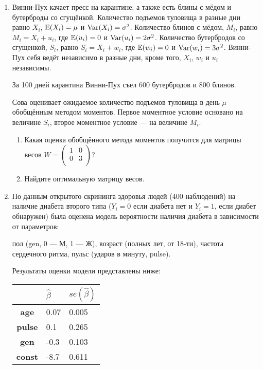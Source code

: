 \begin{enumerate}
  \item 
  Винни-Пух качает пресс на карантине, а также есть блины с мёдом и бутерброды со сгущёнкой. 
  Количество подъемов туловища в разные дни равно $X_i$, $\operatorname{\mathbb{E}}(X_i) = \mu$ и $\operatorname{Var}(X_i) = \sigma^2$.
  Количество блинов с мёдом, $M_i$, равно  $M_i = X_i + u_i$, где $\operatorname{\mathbb{E}}(u_i) = 0$ и $\operatorname{Var}(u_i)= 2\sigma^2$. 
  Количество бутербродов со сгущенкой, $S_i$, равно  $S_i = X_i + w_i$, где $\operatorname{\mathbb{E}}(w_i) = 0$ и $\operatorname{Var}(w_i)= 3\sigma^2$. 
  Винни-Пух себя ведёт независимо в разные дни, кроме того, $X_i$, $w_i$ и $u_i$ независимы.


  За 100 дней карантина Винни-Пух съел 600 бутербродов и 800 блинов. 

  Сова оценивает ожидаемое количество подъемов туловища в день $\mu$ обобщённым методом моментов.
  Первое моментное условие основано на величине $S_i$, второе моментное условие — на величине $M_i$.

  \begin{enumerate}
    \item Какая оценка обобщённого метода моментов получится для матрицы весов
  $W= \begin{pmatrix}
  1 & 0 \\
  0 & 3 \\
  \end{pmatrix}$?

  \item Найдите оптимальную матрицу весов.
  \end{enumerate}

  \item По данным открытого скрининга здоровья людей (400 наблюдений) на наличие диабета второго типа 
  ($Y_i= 0$ если диабета нет и $Y_i=1$, если диабет обнаружен) 
  была оценена модель вероятности наличия диабета в зависимости от параметров:

  пол (gen, 0 — М, 1 — Ж), возраст (полных лет, от 18-ти), частота сердечного ритма, пульс (ударов в минуту, pulse).

  Результаты оценки модели представлены ниже:

    \begin{tabular}{@{}cll@{}}
    \toprule
    \textbf{}      & $\hat\beta$ & $se(\hat \beta)$ \\ \midrule
    \textbf{age}   & 0.07                           & 0.005                              \\ 
    \textbf{pulse} & 0.1                            & 0.265                              \\ 
    \textbf{gen}   & -0.3                           & 0.103                              \\
    \textbf{const} & -8.7                           & 0.611                              \\ \bottomrule
    \end{tabular}
   

\end{enumerate}
